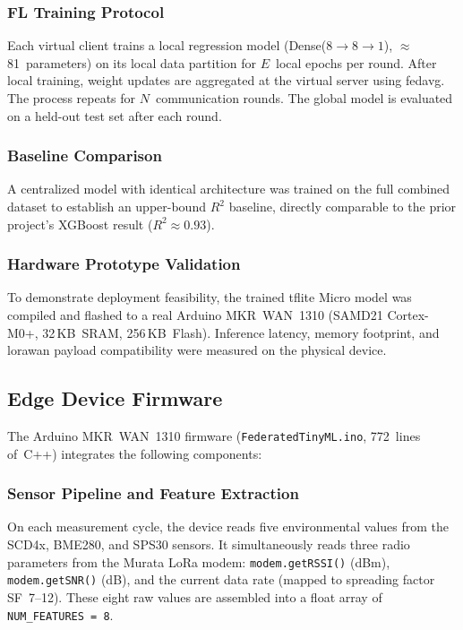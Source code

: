 \documentclass[12pt, a4paper, twoside, openright]{report}
\begin{document}
\subsubsection{FL Training Protocol}
Each virtual client trains a local regression model (Dense($8\!\to\!8\!\to\!1$), $\approx$81~parameters) on its local data partition for $E$~local epochs per round. After local training, weight updates are aggregated at the virtual server using \gls{fedavg}. The process repeats for $N$~communication rounds. The global model is evaluated on a held-out test set after each round.

\subsubsection{Baseline Comparison}
A centralized model with identical architecture was trained on the full combined dataset to establish an upper-bound $R^2$ baseline, directly comparable to the prior project's XGBoost result ($R^2 \approx 0.93$).

\subsubsection{Hardware Prototype Validation}
To demonstrate deployment feasibility, the trained \gls{tflite} Micro model was compiled and flashed to a real Arduino MKR~WAN~1310 (SAMD21 Cortex-M0+, 32\,KB~SRAM, 256\,KB~Flash). Inference latency, memory footprint, and \gls{lorawan} payload compatibility were measured on the physical device.

\subsection{Edge Device Firmware}
\label{sec:edge-firmware}
The Arduino MKR~WAN~1310 firmware (\texttt{FederatedTinyML.ino}, 772~lines of~C++) integrates the following components:

\subsubsection{Sensor Pipeline and Feature Extraction}
On each measurement cycle, the device reads five environmental values from the SCD4x, BME280, and SPS30 sensors. It simultaneously reads three radio parameters from the Murata LoRa modem: \texttt{modem.getRSSI()} (dBm), \texttt{modem.getSNR()} (dB), and the current data rate (mapped to spreading factor SF~7--12). These eight raw values are assembled into a float array of \texttt{NUM\_FEATURES~=~8}.
\end{document}
